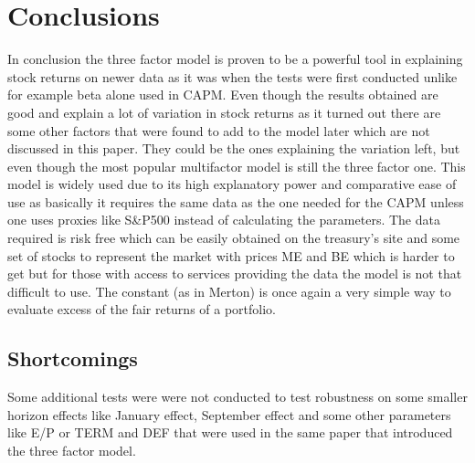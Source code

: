 \documentclass[a4paper,12pt]{article} %
\begin{document}
\section{Conclusions}
In conclusion the three factor model is proven to be a powerful tool in explaining stock returns on newer data as it was when the tests were first conducted unlike for example beta alone used in CAPM. Even though the results obtained are good and explain a lot of variation in stock returns as it turned out there are some other factors that were found to add to the model later which are not discussed in this paper. They could be the ones explaining the variation left, but even though the most popular multifactor model is still the three factor one. 
This model is widely used due to its high explanatory power and comparative ease of use as basically it requires the same data as the one needed for the CAPM unless one uses proxies like S\&P500 instead of calculating the parameters. The data required is risk free which can be easily obtained on the treasury's site and some set of stocks to represent the market with prices ME and BE which is harder to get but for those with access to services providing the data the model is not that difficult to use. The constant (as in Merton) is once again a very simple way to evaluate excess of the fair returns of a portfolio.
\subsection{Shortcomings}
Some additional tests were were not conducted to test robustness on some smaller horizon effects like January effect, September effect and some other parameters like E/P or TERM and DEF that were used in the same paper that introduced the three factor model.


\linespread{1}
\end{document}
